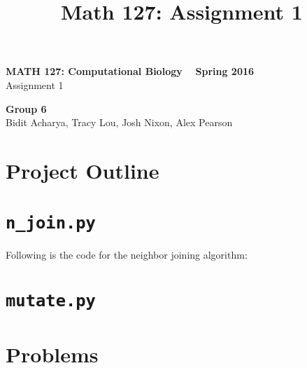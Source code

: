 \documentclass[11pt]{article}
\title{Math 127: Assignment 1}
\theoremstyle{definition}\newtheorem*{problem}{Problem}
\theoremstyle{remark}\newtheorem{claim}{Claim}
\theoremstyle{remark}\newtheorem*{sol}{Solution}
\begin{document}
\begin{center} {\Large \bf MATH 127: Computational Biology ~ Spring 2016 } \\
                [8pt]{Assignment 1\\ [8pt]}\end{center}
                
                \begin{center} \textbf{Group 6}\\ Bidit Acharya, Tracy Lou, Josh Nixon, Alex Pearson
                \end{center}
\section{Project Outline}
\blindtext

\blindtext
\section{\texttt {n\_join.py}}
Following is the code for the neighbor joining algorithm:

\section{\texttt {mutate.py}}

\section{Problems}
\end{document}
